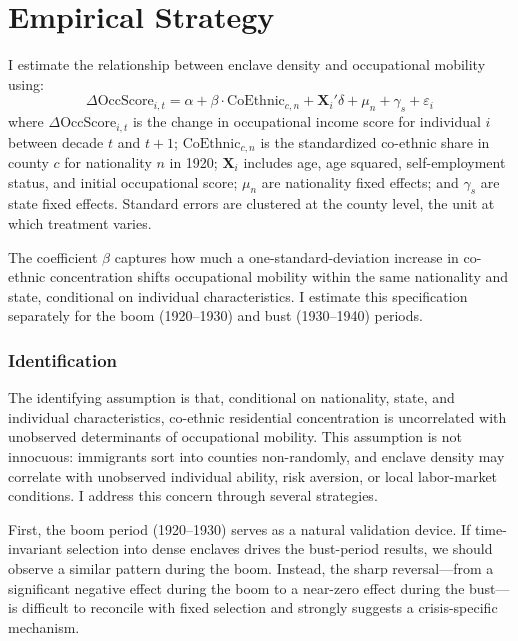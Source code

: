 \documentclass[12pt]{article}
\begin{document}
\section{Empirical Strategy}

I estimate the relationship between enclave density and occupational mobility using:
\begin{equation}
\Delta \text{OccScore}_{i,t} = \alpha + \beta \cdot \text{CoEthnic}_{c,n} + \mathbf{X}_i' \delta + \mu_n + \gamma_s + \varepsilon_{i}
\label{eq:main}
\end{equation}
where $\Delta \text{OccScore}_{i,t}$ is the change in occupational income score for individual $i$ between decade $t$ and $t+1$; $\text{CoEthnic}_{c,n}$ is the standardized co-ethnic share in county $c$ for nationality $n$ in 1920; $\mathbf{X}_i$ includes age, age squared, self-employment status, and initial occupational score; $\mu_n$ are nationality fixed effects; and $\gamma_s$ are state fixed effects. Standard errors are clustered at the county level, the unit at which treatment varies.

The coefficient $\beta$ captures how much a one-standard-deviation increase in co-ethnic concentration shifts occupational mobility within the same nationality and state, conditional on individual characteristics. I estimate this specification separately for the boom (1920--1930) and bust (1930--1940) periods.

\subsubsection*{Identification} The identifying assumption is that, conditional on nationality, state, and individual characteristics, co-ethnic residential concentration is uncorrelated with unobserved determinants of occupational mobility. This assumption is not innocuous: immigrants sort into counties non-randomly, and enclave density may correlate with unobserved individual ability, risk aversion, or local labor-market conditions. I address this concern through several strategies.

First, the boom period (1920--1930) serves as a natural validation device. If time-invariant selection into dense enclaves drives the bust-period results, we should observe a similar pattern during the boom. Instead, the sharp reversal---from a significant negative effect during the boom to a near-zero effect during the bust---is difficult to reconcile with fixed selection and strongly suggests a crisis-specific mechanism.
\end{document}
